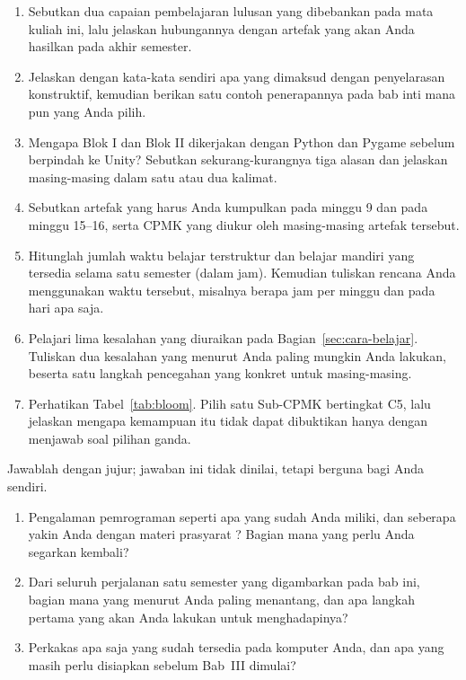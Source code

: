 
\begin{enumerate}
  \item Sebutkan dua capaian pembelajaran lulusan yang dibebankan pada mata
        kuliah ini, lalu jelaskan hubungannya dengan artefak yang akan Anda
        hasilkan pada akhir semester.

  \item Jelaskan dengan kata-kata sendiri apa yang dimaksud dengan
        penyelarasan konstruktif, kemudian berikan satu contoh penerapannya
        pada bab inti mana pun yang Anda pilih.

  \item Mengapa Blok I dan Blok II dikerjakan dengan Python dan Pygame
        sebelum berpindah ke Unity? Sebutkan sekurang-kurangnya tiga alasan
        dan jelaskan masing-masing dalam satu atau dua kalimat.

  \item Sebutkan artefak yang harus Anda kumpulkan pada minggu 9 dan pada
        minggu 15--16, serta CPMK yang diukur oleh masing-masing artefak
        tersebut.

  \item Hitunglah jumlah waktu belajar terstruktur dan belajar mandiri yang
        tersedia selama satu semester (dalam jam). Kemudian tuliskan rencana
        Anda menggunakan waktu tersebut, misalnya berapa jam per minggu dan
        pada hari apa saja.

  \item Pelajari lima kesalahan yang diuraikan pada
        Bagian~\ref{sec:cara-belajar}. Tuliskan dua kesalahan yang menurut
        Anda paling mungkin Anda lakukan, beserta satu langkah pencegahan
        yang konkret untuk masing-masing.

  \item Perhatikan Tabel~\ref{tab:bloom}. Pilih satu Sub-CPMK bertingkat C5,
        lalu jelaskan mengapa kemampuan itu tidak dapat dibuktikan hanya
        dengan menjawab soal pilihan ganda.
\end{enumerate}

\begin{refleksibox}
Jawablah dengan jujur; jawaban ini tidak dinilai, tetapi berguna bagi Anda
sendiri.
\begin{enumerate}
  \item Pengalaman pemrograman seperti apa yang sudah Anda miliki, dan
        seberapa yakin Anda dengan materi prasyarat \MataKuliahPrasyarat?
        Bagian mana yang perlu Anda segarkan kembali?
  \item Dari seluruh perjalanan satu semester yang digambarkan pada bab ini,
        bagian mana yang menurut Anda paling menantang, dan apa langkah
        pertama yang akan Anda lakukan untuk menghadapinya?
  \item Perkakas apa saja yang sudah tersedia pada komputer Anda, dan apa
        yang masih perlu disiapkan sebelum Bab~III dimulai?
\end{enumerate}
\end{refleksibox}
